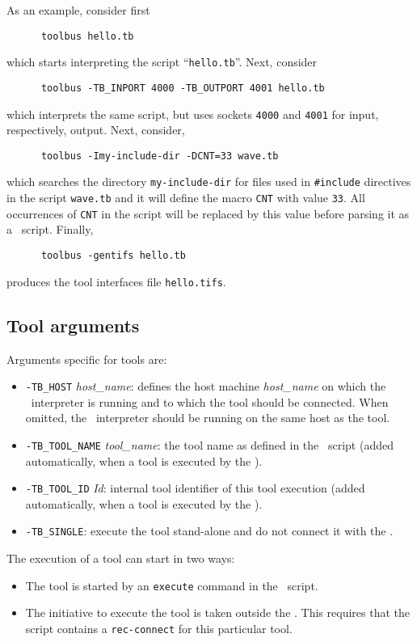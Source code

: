 \noindent As an example, consider first
\begin{verbatim}
      toolbus hello.tb
\end{verbatim}
which starts interpreting the script ``{\tt hello.tb}''. Next, consider
\begin{verbatim}
      toolbus -TB_INPORT 4000 -TB_OUTPORT 4001 hello.tb
\end{verbatim}
which interprets the same script, but uses sockets {\tt 4000} and {\tt 4001} for
input, respectively, output. Next, consider,
\begin{verbatim}
      toolbus -Imy-include-dir -DCNT=33 wave.tb
\end{verbatim}
which searches the directory {\tt my-include-dir} for files used in {\tt \#include}
directives in the script {\tt wave.tb} and it will define the macro
{\tt CNT} with value {\tt 33}. All occurrences of {\tt CNT} in the script
will be replaced by this value before parsing it as a \T\ script.
Finally,
\begin{verbatim}
      toolbus -gentifs hello.tb
\end{verbatim}
produces the tool interfaces file {\tt hello.tifs}.

\subsection{\label{ToolArgs}Tool arguments}
Arguments specific for tools are:
\begin{itemize}
\item {\tt -TB\_HOST} {\em host\_name}: defines the host machine {\em host\_name}
on which the \TB\ interpreter is running and to which the tool should be connected.
When omitted, the \TB\ interpreter should be running on the same
host as the tool.
\item {\tt -TB\_TOOL\_NAME} {\em tool\_name}: the tool name as
defined in the \T\ script (added automatically, when a tool is executed
by the \TB).
\item {\tt -TB\_TOOL\_ID} {\em Id}: internal tool identifier of this tool execution
(added automatically, when a tool is executed by the \TB).
\item {\tt -TB\_SINGLE}: execute the tool stand-alone and do not connect it
with the \TB.
\end{itemize}

\noindent The execution of a tool can start in two ways:
\begin{itemize}
\item The tool is started by an {\tt execute} command in the \T\ script.

\item The initiative to execute the tool is taken
outside the \TB. This requires that the script contains a {\tt rec-connect}
for this particular tool.
\end{itemize}

